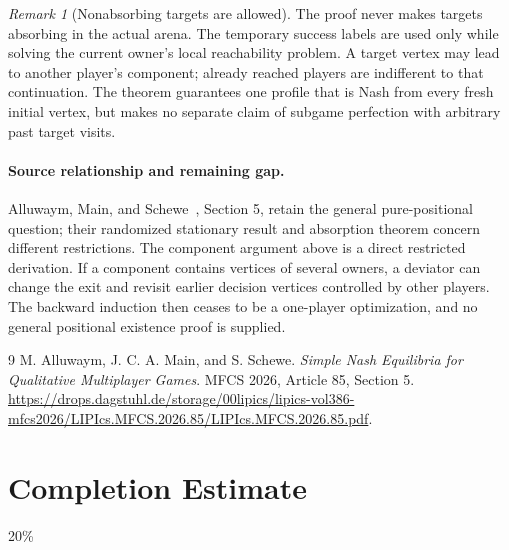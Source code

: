 \documentclass[11pt]{article}
\theoremstyle{definition}
\theoremstyle{remark}
\newtheorem{remark}{Remark}
\begin{document}
\begin{remark}[Nonabsorbing targets are allowed]
The proof never makes targets absorbing in the actual arena. The temporary success labels are used only while solving the current owner's local reachability problem. A target vertex may lead to another player's component; already reached players are indifferent to that continuation. The theorem guarantees one profile that is Nash from every fresh initial vertex, but makes no separate claim of subgame perfection with arbitrary past target visits.
\end{remark}

\paragraph{Source relationship and remaining gap.}
Alluwaym, Main, and Schewe~\cite{source}, Section 5, retain the general pure-positional question; their randomized stationary result and absorption theorem concern different restrictions. The component argument above is a direct restricted derivation. If a component contains vertices of several owners, a deviator can change the exit and revisit earlier decision vertices controlled by other players. The backward induction then ceases to be a one-player optimization, and no general positional existence proof is supplied.

\begin{thebibliography}{9}
 M. Alluwaym, J. C. A. Main, and S. Schewe.
\emph{Simple Nash Equilibria for Qualitative Multiplayer Games}. MFCS 2026, Article 85, Section 5.
\url{https://drops.dagstuhl.de/storage/00lipics/lipics-vol386-mfcs2026/LIPIcs.MFCS.2026.85/LIPIcs.MFCS.2026.85.pdf}.
\end{thebibliography}

\section{Completion Estimate}
20\%
\end{document}
